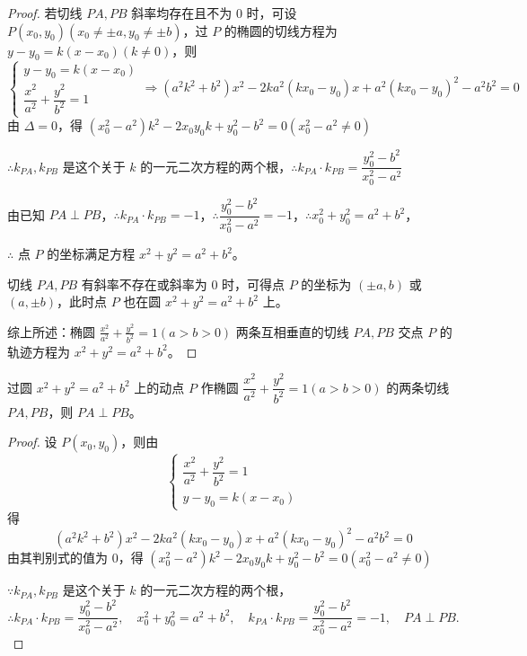 \begin{proof}
若切线 $PA, PB$ 斜率均存在且不为 $0$ 时，可设 $P(x_0, y_0) (x_0 \neq \pm a, y_0 \neq \pm b)$，过 $P$ 的椭圆的切线方程为 $y - y_0 = k(x - x_0) (k \neq 0)$，则
\[
\begin{cases}
y - y_0 = k(x - x_0) \\
\dfrac{x^2}{a^2} + \dfrac{y^2}{b^2} = 1
\end{cases}
\Rightarrow (a^2k^2 + b^2)x^2 - 2ka^2(kx_0 - y_0)x + a^2(kx_0 - y_0)^2 - a^2b^2 = 0
\]
由 $\Delta = 0$，得 $(x_0^2 - a^2)k^2 - 2x_0y_0k + y_0^2 - b^2 = 0 (x_0^2 - a^2 \neq 0)$

$\therefore k_{PA}, k_{PB}$ 是这个关于 $k$ 的一元二次方程的两个根，$\therefore k_{PA} \cdot k_{PB} = \dfrac{y_0^2 - b^2}{x_0^2 - a^2}$

由已知 $PA \perp PB$，$\therefore k_{PA} \cdot k_{PB} = -1$，$\therefore \dfrac{y_0^2 - b^2}{x_0^2 - a^2} = -1$，$\therefore x_0^2 + y_0^2 = a^2 + b^2$，

$\therefore$ 点 $P$ 的坐标满足方程 $x^2 + y^2 = a^2 + b^2$。

切线 $PA, PB$ 有斜率不存在或斜率为 $0$ 时，可得点 $P$ 的坐标为 $(\pm a, b)$ 或 $(a, \pm b)$，此时点 $P$ 也在圆 $x^2 + y^2 = a^2 + b^2$ 上。

综上所述：椭圆 $\frac{x^2}{a^2} + \frac{y^2}{b^2} = 1 (a > b > 0)$ 两条互相垂直的切线 $PA, PB$ 交点 $P$ 的轨迹方程为 $x^2 + y^2 = a^2 + b^2$。
\end{proof}
\begin{corollary}
    过圆 $x^2 + y^2 = a^2 + b^2$ 上的动点 $P$ 作椭圆 $\dfrac{x^2}{a^2} + \dfrac{y^2}{b^2} = 1 (a > b > 0)$ 的两条切线 $PA, PB$，则 $PA \perp PB$。
\end{corollary}
\begin{proof}
    设 $P(x_0, y_0)$，则由
\[
\begin{cases}
\dfrac{x^2}{a^2} + \dfrac{y^2}{b^2} = 1 \\
y - y_0 = k(x - x_0)
\end{cases}
\]
得
\[
(a^2k^2 + b^2)x^2 - 2ka^2(kx_0 - y_0)x + a^2(kx_0 - y_0)^2 - a^2b^2 = 0
\]
由其判别式的值为 $0$，得 $(x_0^2 - a^2)k^2 - 2x_0y_0k + y_0^2 - b^2 = 0 (x_0^2 - a^2 \neq 0)$

$\because k_{PA}, k_{PB}$ 是这个关于 $k$ 的一元二次方程的两个根，
\[
\therefore k_{PA} \cdot k_{PB} = \frac{y_0^2 - b^2}{x_0^2 - a^2}, \quad x_0^2 + y_0^2 = a^2 + b^2, \quad k_{PA} \cdot k_{PB} = \frac{y_0^2 - b^2}{x_0^2 - a^2} = -1, \quad PA \perp PB.
\]

\end{proof}
